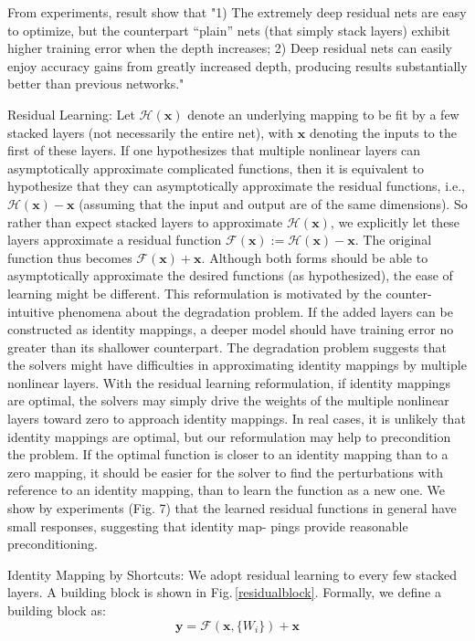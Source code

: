 From experiments, result show that "1) The extremely deep residual nets are easy to optimize, but the counterpart “plain” nets (that simply stack layers) exhibit higher training error when the depth increases; 2) Deep residual nets can easily enjoy accuracy gains from greatly increased depth, producing results substantially better than previous networks." \citep{resnet}

Residual Learning:
Let $\mathcal{H}(\mathbf{x})$ denote an underlying mapping to be fit by a few stacked layers (not necessarily the entire net), with $\mathbf{x}$ denoting the inputs to the first of these layers. If one hypothesizes that multiple nonlinear layers can asymptotically approximate complicated functions, then it is equivalent to hypothesize that they can asymptotically approximate the residual functions, i.e., $\mathcal{H}(\mathbf{x}) - \mathbf{x}$ (assuming that the input and output are of the same dimensions). So rather than expect stacked layers to approximate $\mathcal{H}(\mathbf{x})$, we explicitly let these layers approximate a residual function $\mathcal{F}(\mathbf{x}) := \mathcal{H}(\mathbf{x})-\mathbf{x}$. The original function thus becomes $\mathcal{F}(\mathbf{x})+\mathbf{x}$. Although both forms should be able to asymptotically approximate the desired functions (as hypothesized), the ease of learning might be different. 
This reformulation is motivated by the counter-intuitive phenomena about the degradation problem. If the added layers can be constructed as identity mappings, a deeper model should have training error no greater than its shallower counterpart. The degradation problem suggests that the solvers might have difficulties in approximating identity mappings by multiple nonlinear layers. With the residual learning reformulation, if identity mappings are optimal, the solvers may simply drive the weights of the multiple nonlinear layers toward zero to approach identity mappings. 
In real cases, it is unlikely that identity mappings are optimal, but our reformulation may help to precondition the problem. If the optimal function is closer to an identity mapping than to a zero mapping, it should be easier for the solver to find the perturbations with reference to an identity mapping, than to learn the function as a new one. We show by experiments (Fig. 7) that the learned residual functions in general have small responses, suggesting that identity map- pings provide reasonable preconditioning. 

Identity Mapping by Shortcuts: 
We adopt residual learning to every few stacked layers. A building block is shown in Fig.\,\ref{residualblock}. Formally, we define a building block as: 
\begin{equation} \label{eq1}
\mathbf{y} = \mathcal{F} (\mathbf{x}, \{W_i\}) + \mathbf{x}
\end{equation}

